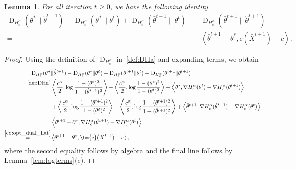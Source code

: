 \documentclass[10pt]{article}
\newcommand{\DHa}{\D_{H_c^\alpha}}
\newcommand{\inner}[2]{\left\langle #1,#2\right\rangle}
\newcommand{\D}{\operatorname{D}}
\theoremstyle{plain}
\newtheorem{lemma}[theorem]{Lemma}
\theoremstyle{definition}
\theoremstyle{remark}
\newcommand{\col}{\bm{\mathrm{c}}}
\begin{document}
\begin{lemma}\label{lem:Dha_diff}
    For all iteration $t\geq 0$, we have the following identity
    \begin{align}
        \nonumber\DHa(\theta^*\|\hat\theta^{t+1})-\DHa(\theta^*\|\theta^t)+\DHa(\bar\theta^{t+1}\|\theta^t)-&\DHa(\bar\theta^{t+1}\|\hat\theta^{t+1})
        \\
        =&\inner{\bar\theta^{t+1} - \theta^{*}}{\col(\bar X^{t+1})-c}.\label{eq:dual_div_diff}
    \end{align}
\end{lemma}
\begin{proof}
    Using the definition of $\DHa$ in~\eqref{def:DHa} and expanding terms, we obtain
    \begin{align*}
       \DHa(\theta^*&\|\hat\theta^{t+1}) -\DHa(\theta^*\|\theta^t)+\DHa(\bar\theta^{t+1}\|\theta^t)-\DHa(\bar\theta^{t+1}\|\hat\theta^{t+1})\\
        \stackrel{\eqref{def:DHa}}=&\inner{\frac{c^\alpha}{2}}{\log\frac{1-(\theta^*)^2}{1-(\hat\theta^{t+1})^2}}-\inner{\frac{c^\alpha}{2}}{\log\frac{1-(\theta^*)^2}{1-(\theta^t)^2}} +\inner{\theta^*}{\nabla H_c^\alpha(\theta^{t})-\nabla H_c^\alpha(\hat\theta^{t+1})}\\
        &+\inner{\frac{c^\alpha}{2}}{\log\frac{1-(\bar\theta^{t+1})^2}{1-(\theta^t)^2}}-\inner{\frac{c^\alpha}{2}}{\log\frac{1-(\bar\theta^{t+1})^2}{1-(\hat\theta^{t+1})^2}} +\inner{\bar\theta^{t+1}}{\nabla H_c^\alpha(\hat\theta^{t+1})- \nabla H_c^\alpha(\theta^{t})}\\
        =&\inner{\bar\theta^{t+1} - \theta^{*}}{\nabla H_c^\alpha(\hat\theta^{t+1})- \nabla H_c^\alpha(\theta^{t})}\\
        \stackrel{\eqref{eq:opt_dual_hat}}=&\inner{\bar\theta^{t+1} - \theta^{*}}{\col(\bar X^{t+1})-c},
    \end{align*}
    where the second equality follows by algebra and the final line follows by Lemma~\ref{lem:logterms}(c).
\end{proof}
\end{document}

